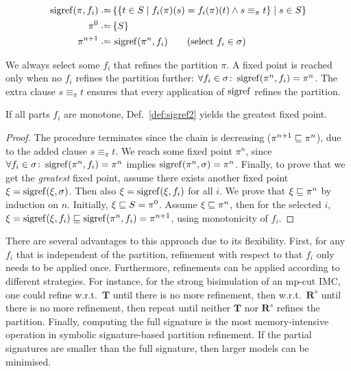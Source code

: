 \begin{definition}
\label{def:sigref2}
\setlength{\abovedisplayskip}{0.4em}
\setlength{\belowdisplayskip}{0pt}
\begin{align*}
\sigref(\pi,f_i) \defeq\, & \{\{t\in S\mid f_i(\pi)(s) = f_i(\pi)(t) \wedge s \equiv_{\pi} t \}\mid s\in S\} \\
\pi^0 \defeq\, & \{S\} \\
\pi^{n+1} \defeq\, & \sigref(\pi^n, f_i) \qquad (\textnormal{select $f_i\in\sig$})\\
\end{align*}
\end{definition}
\vspace{-1.5em}

We always select some $f_i$ that refines the partition $\pi$.
A fixed point is reached only when no $f_i$ refines the partition further: $\forall f_i\in \sigma\colon \operatorname{sigref}(\pi^n, f_i)=\pi^n$.
The extra clause $s \equiv_{\pi} t$ ensures that every application of $\operatorname{sigref}$ refines the partition.

\begin{theorem}If all parts $f_i$ are monotone, Def.~\ref{def:sigref2} yields the greatest fixed point.\end{theorem}
\begin{proof}
The procedure terminates since the chain is decreasing ($\pi^{n+1}\sqsubseteq\pi^n$), due to the added clause $s \equiv_{\pi} t$.
We reach some fixed point $\pi^n$, since $\forall f_i\in \sigma\colon \operatorname{sigref}(\pi^n, f_i)=\pi^n$ implies $\operatorname{sigref}(\pi^n, \sigma)=\pi^n$.
Finally, to prove that we get the {\em greatest} fixed point, 
assume there exists another fixed point $\xi=\operatorname{sigref}(\xi,\sigma)$. Then also $\xi=\operatorname{sigref}(\xi,f_i)$ for all $i$.
We prove that $\xi\sqsubseteq \pi^n$ by induction on $n$. Initially, $\xi\sqsubseteq {S}=\pi^0$. Assume $\xi\sqsubseteq \pi^n$, then
for the selected $i$, $\xi=\operatorname{sigref}(\xi,f_i)\sqsubseteq \operatorname{sigref}(\pi^n,f_i)=\pi^{n+1}$, using monotonicity of $f_i$. 
\end{proof}

There are several advantages to this approach due to its flexibility.
First, for any $f_i$ that is independent of the partition, refinement with respect to that $f_i$ only needs to be applied once.
Furthermore, refinements can be applied according to different strategies.
For instance, for the strong bisimulation of an mp-cut IMC, one could refine w.r.t.\ $\textbf{T}$ until there is no more refinement, 
then w.r.t.\ $\textbf{R}^s$ until there is no more refinement, 
then repeat until neither $\textbf{T}$ nor $\textbf{R}^s$ refines the partition.
%
%
Finally, computing the full signature is the most memory-intensive operation in symbolic signature-based partition refinement.
If the partial signatures are smaller than the full signature, then larger models can be minimised.
